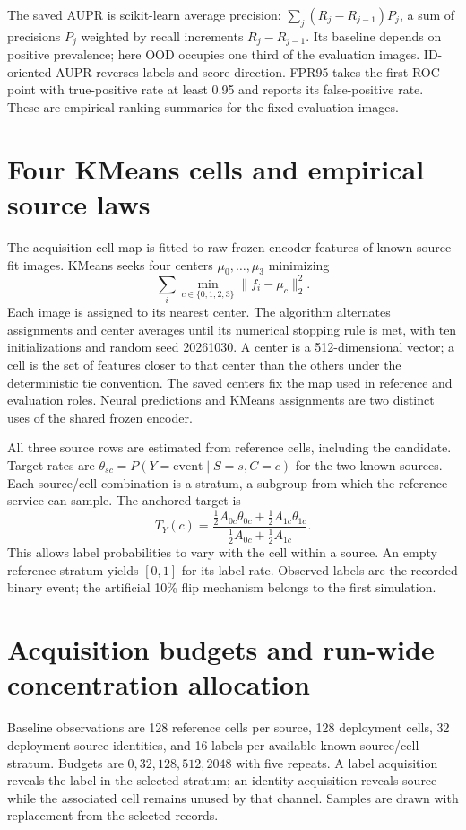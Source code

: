 \documentclass[11pt,a4paper]{report}
\begin{document}
The saved AUPR is scikit-learn average precision: $\sum_j(R_j-R_{j-1})P_j$, a sum of precisions $P_j$ weighted by recall increments $R_j-R_{j-1}$. Its baseline depends on positive prevalence; here OOD occupies one third of the evaluation images. ID-oriented AUPR reverses labels and score direction. FPR95 takes the first ROC point with true-positive rate at least 0.95 and reports its false-positive rate. These are empirical ranking summaries for the fixed evaluation images.

\section{Four KMeans cells and empirical source laws}
The acquisition cell map is fitted to raw frozen encoder features of known-source fit images. KMeans seeks four centers $\mu_0,\ldots,\mu_3$ minimizing
\begin{equation}
\sum_i\min_{c\in\{0,1,2,3\}}\|f_i-\mu_c\|_2^2.
\end{equation}
Each image is assigned to its nearest center. The algorithm alternates assignments and center averages until its numerical stopping rule is met, with ten initializations and random seed 20261030. A center is a 512-dimensional vector; a cell is the set of features closer to that center than the others under the deterministic tie convention. The saved centers fix the map used in reference and evaluation roles. Neural predictions and KMeans assignments are two distinct uses of the shared frozen encoder.

All three source rows are estimated from reference cells, including the candidate. Target rates are $\theta_{sc}=P(Y=\text{event}\mid S=s,C=c)$ for the two known sources. Each source/cell combination is a stratum, a subgroup from which the reference service can sample. The anchored target is
\begin{equation}
T_Y(c)=\frac{\tfrac12A_{0c}\theta_{0c}+\tfrac12A_{1c}\theta_{1c}}
{\tfrac12A_{0c}+\tfrac12A_{1c}}.
\end{equation}
This allows label probabilities to vary with the cell within a source. An empty reference stratum yields $[0,1]$ for its label rate. Observed labels are the recorded binary event; the artificial 10\% flip mechanism belongs to the first simulation.

\section{Acquisition budgets and run-wide concentration allocation}
Baseline observations are 128 reference cells per source, 128 deployment cells, 32 deployment source identities, and 16 labels per available known-source/cell stratum. Budgets are $0,32,128,512,2048$ with five repeats. A label acquisition reveals the label in the selected stratum; an identity acquisition reveals source while the associated cell remains unused by that channel. Samples are drawn with replacement from the selected records.
\end{document}
